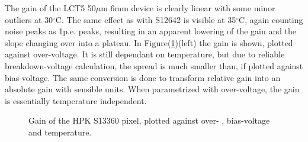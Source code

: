 \documentclass[12pt,article,type=msc,colorback,accentcolor=tud9c]{tudthesis}
\begin{document}
The gain of the LCT5 50$\mu$m 6mm device is clearly linear with some minor outliers at 30$^{\circ}$C.  The same effect as with S12642 is visible at 35$^{\circ}$C, again counting noise peaks as 1p.e. peaks, resulting in an apparent lowering of the gain and the slope changing over into a plateau. In Figure(\ref{fig:S13360_Gain})(left) the gain is shown, plotted against over-voltage. It is still dependant on temperature, but due to reliable breakdown-voltage calculation, the spread is much smaller than, if plotted against bias-voltage. The same conversion is done to transform relative gain into an absolute gain with sensible units. When parametrized with over-voltage, the gain is essentially temperature independent.
\begin{figure}[h]
\begin{centering}
\caption{Gain of the HPK S13360 pixel, plotted against over- , bias-voltage and temperature. }
\label{fig:S13360_Gain}
\end{centering}
\end{figure}


\end{document}
